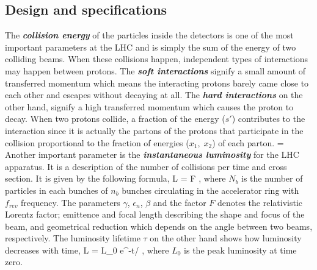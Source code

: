 \subsection{Design and specifications}

The \textbf{\emph{collision energy}} of the particles inside the detectors is one of the most important parameters at the LHC and is simply the sum of the energy of two colliding beams. When these collisions happen, independent types of interactions may happen between protons. The \textbf{\emph{soft interactions}} signify a small amount of transferred momentum which means the interacting protons barely came close to each other and escapes without decaying at all. The \textbf{\emph{hard interactions}} on the other hand, signify a high transferred momentum which causes the proton to decay. When two protons collide, a fraction of the energy ($s\prime$) contributes to the interaction since it is actually the partons of the protons that participate in the collision proportional to the fraction of energies ($x_1,\; x_2$) of each parton.
\be
{} = 
\ee
Another important parameter is the \textbf{\emph{instantaneous luminosity}} for the LHC apparatus. It is a description of the number of collisions per time and cross section. It is given by the following formula,
\be
L = F \; ,
\ee
where $N_b$ is the number of particles in each bunches of $n_b$ bunches circulating in the accelerator ring with $f_{rev}$ frequency. The parameters $\gamma$, $\epsilon_n$, $\beta$ and the factor $F$ denotes the relativistic Lorentz factor; emittence and focal length describing the shape and focus of the beam, and geometrical reduction which depends on the angle between two beams, respectively. The luminosity lifetime $\tau$ on the other hand shows how luminosity decreases with time,
\be
L = L_0 e^{-t/\tau} \; ,
\ee
where $L_0$ is the peak luminosity at time zero.


